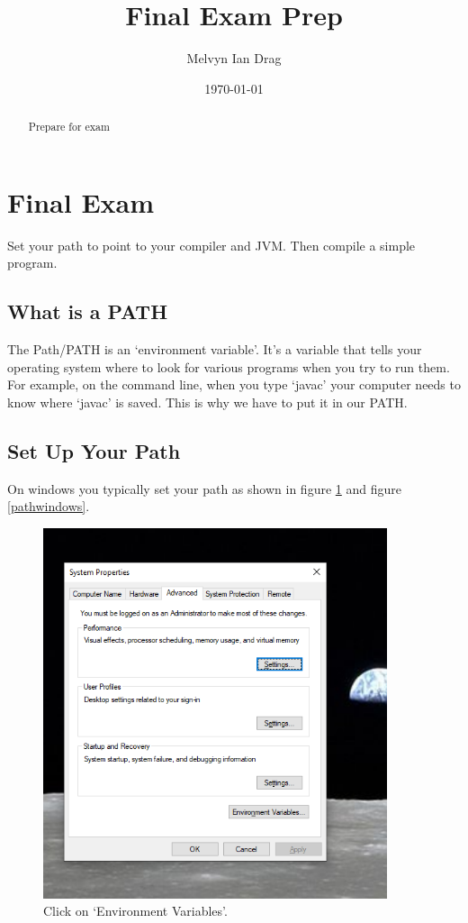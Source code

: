 \documentclass[12pt]{article}
\title{Final Exam Prep}
\author{
	Melvyn Ian Drag
}
\date{\today}
\begin{document}
\maketitle

\begin{abstract}
Prepare for exam
\end{abstract}

\section{Final Exam}
Set your path to point to your compiler and JVM. Then compile a simple program.

\subsection{What is a PATH}
The Path/PATH is an `environment variable'. It's a variable that tells your
operating system where to look for various programs when you try to run them.
For example, on the command line, when you type `javac' your computer needs to
know where `javac' is saved. This is why we have to put it in our PATH.

\subsection{Set Up Your Path}
On windows you typically set your path as shown in figure \ref{setenvvar} and
figure \ref{pathwindows}.

\begin{figure}[h]
  \centering
    \includegraphics[width=0.9\textwidth]{Images/windowssetenv.PNG}
  \caption{Click on `Environment Variables'.}
	\label{setenvvar}
\end{figure}
\end{document}
